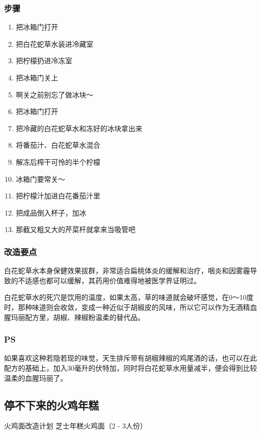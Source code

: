 \documentclass[12pt, a4paper]{ctexart}
\begin{document}
\subsubsection{步骤}
\begin{enumerate}[start=0]
    \item{把冰箱门打开}
    \item{把白花蛇草水装进冷藏室}
    \item{把柠檬扔进冷冻室}
    \item{把冰箱门关上}
    \item{啊关之前别忘了做冰块～}
    \item{把冰箱门打开}
    \item{把冷藏的白花蛇草水和冻好的冰块拿出来}
    \item{将番茄汁、白花蛇草水混合}
    \item{解冻后榨干可怜的半个柠檬}
    \item{冰箱门要常关～}
    \item{把柠檬汁加进白花番茄汁里}
    \item{把成品倒入杯子，加冰}
    \item{那截又粗又大的芹菜杆就拿来当吸管吧}
\end{enumerate}

\subsubsection{改造要点}
白花蛇草水本身保健效果拔群，非常适合扁桃体炎的缓解和治疗，咽炎和因雾霾导致的不适感也都可以缓解，其药用价值难得地被医学界证明过。

白花蛇草水的死穴是饮用的温度，如果太高，草的味道就会破坏感觉，在0～10度时，那种味道则会收敛，变成一种近似于胡椒皮的风味，所以它可以作为无酒精血腥玛丽配方里，胡椒、辣椒粉温柔的替代品。

\subsubsection{PS}
如果喜欢这种若隐若现的味觉，天生排斥带有胡椒辣椒的鸡尾酒的话，也可以在此配方的基础上，加入30毫升的伏特加，同时将白花蛇草水用量减半，便会得到比较温柔的血腥玛丽了。

\subsection{停不下来的火鸡年糕}
火鸡面改造计划 芝士年糕火鸡面（2 - 3人份）
\end{document}
